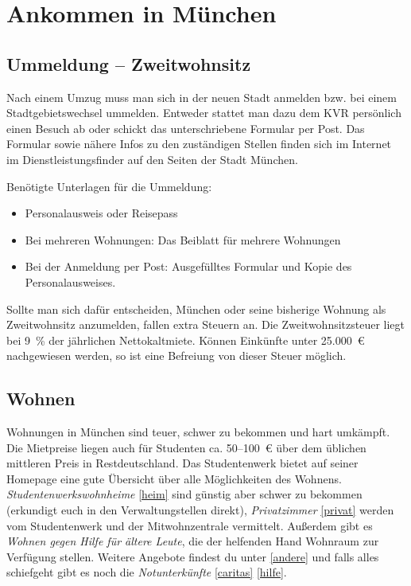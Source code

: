 \chapter{Ankommen in München}

\section{Ummeldung -- Zweitwohnsitz}

Nach einem Umzug muss man sich in der neuen Stadt anmelden bzw. bei einem Stadtgebietswechsel ummelden. Entweder stattet man dazu dem KVR persönlich einen Besuch ab oder schickt das unterschriebene Formular per Post. Das Formular sowie nähere Infos zu den zuständigen Stellen finden sich im Internet im Dienstleistungsfinder auf den Seiten der Stadt München.

Benötigte Unterlagen für die Ummeldung: %
\begin{itemize}
	\item Personalausweis oder Reisepass
	\item Bei mehreren Wohnungen: Das Beiblatt für mehrere Wohnungen
	\item Bei der Anmeldung per Post: Ausgefülltes Formular und Kopie des Personalausweises.
\end{itemize}

Sollte man sich dafür entscheiden, München oder seine bisherige Wohnung als Zweitwohnsitz anzumelden, fallen extra Steuern an. Die Zweitwohnsitzsteuer liegt bei 9~\% der jährlichen Nettokaltmiete. Können Einkünfte unter 25.000~€ nachgewiesen werden, so ist eine Befreiung von dieser Steuer möglich.

\begin{urlList}
\end{urlList}

\section{Wohnen}
Wohnungen in München sind teuer, schwer zu bekommen und hart umkämpft. Die Mietpreise liegen
auch für Studenten ca. 50--100~€ über dem üblichen mittleren Preis in
Restdeutschland. Das Studentenwerk bietet auf seiner Homepage eine
gute Übersicht über alle Möglichkeiten des Wohnens. \emph{Studentenwerkswohnheime} \ref{heim} sind 
günstig aber schwer zu bekommen (erkundigt euch in den Verwaltungstellen direkt), \emph{Privatzimmer} \ref{privat}
werden vom Studentenwerk und der Mitwohnzentrale vermittelt. Außerdem gibt es \emph{Wohnen gegen Hilfe für ältere Leute}, die der helfenden Hand Wohnraum zur Verfügung stellen. Weitere Angebote findest du unter \ref{andere} und falls alles schiefgeht gibt es noch die \emph{Notunterkünfte} \ref{caritas} \ref{hilfe}.



